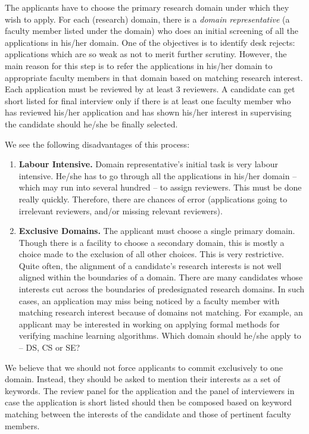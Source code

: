 \documentclass[12pt,a4paper]{article}
\begin{document}
The applicants have to choose the primary research domain under which they wish to apply. For each (research) domain, there is a \emph{domain representative} (a faculty member listed under the domain) who does an initial screening of all the applications in his/her domain. One of the objectives is to identify desk rejects: applications which are so weak as not to merit further scrutiny. However, the main reason for this step is to refer the applications in his/her domain to appropriate faculty members in that domain based on matching research interest. Each application must be reviewed by at least 3 reviewers. A candidate can get short listed for final interview only if there is at least one faculty member who has reviewed his/her application and has shown his/her interest in supervising the candidate should he/she be finally selected.

We see the following disadvantages of this process:
\begin{enumerate}
\item \textbf{Labour Intensive.} Domain representative's initial task is very labour intensive. He/she has to go through all the applications in his/her domain -- which may run into several hundred -- to assign reviewers. This must be done really quickly. Therefore, there are chances of error (applications going to irrelevant reviewers, and/or missing relevant reviewers).
\item \textbf{Exclusive Domains.} The applicant must choose a single primary domain. Though there is a facility to choose a secondary domain, this is mostly a choice made to the exclusion of all other choices. This is very restrictive. Quite often, the alignment of a candidate's research interests is not well aligned within the boundaries of a domain. There are many candidates whose interests cut across the boundaries of predesignated research domains. In such cases, an application may miss being noticed by a faculty member with matching research interest because of domains not matching. For example, an applicant may be interested in working on applying formal methods for verifying machine learning algorithms. Which domain should he/she apply to -- DS, CS or SE? 
\end{enumerate}

We believe that we should not force applicants to commit exclusively to one domain. Instead, they should be asked to mention their interests as a set of keywords. The review panel for the application and the panel of interviewers in case the application is short listed should then be composed based on keyword matching between the interests of the candidate and those of pertinent faculty members.
\end{document}
